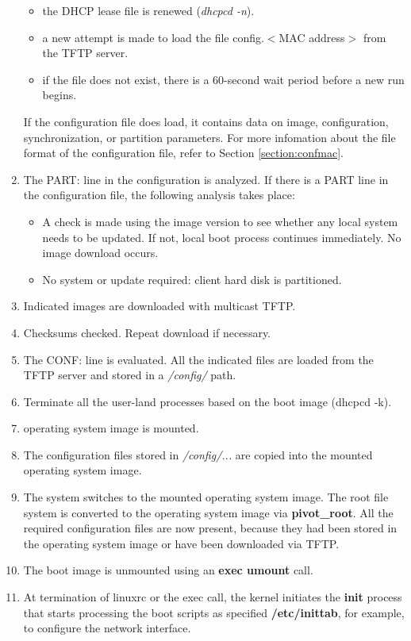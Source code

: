 \begin{enumerate}
          \begin{itemize}
          \item the DHCP lease file is renewed (\textit{dhcpcd -n}).
          \item a new attempt is made to load the file
                config.$<$MAC address$>$ from the TFTP server.
          \item if the file does not exist, there is a 60-second wait
                period before a new run begins.
          \end{itemize}

          If the configuration file does load, it contains data on
          image, configuration, synchronization, or partition parameters.
          For more infomation about the file format of the configuration file,
          refer to Section \ref{section:confmac}.

	\item The PART: line in the configuration is analyzed. If there is a
          PART line in the configuration file, the following analysis
          takes place:
          \begin{itemize}
          \item A check is made using the image version to see whether any
                local system needs to be updated. If not, local boot process
                continues immediately. No image download occurs.
          \item No system or update required: client hard disk is
                partitioned.
          \end{itemize}
	\item Indicated images are downloaded with multicast TFTP.
	\item Checksums checked. Repeat download if necessary.
	\item The CONF: line is evaluated. All the indicated files are loaded
          from the TFTP server and stored in a \textit{/config/} path.
	\item Terminate all the user-land processes based on the boot image
          (dhcpcd -k).
	\item operating system image is mounted.
	\item The configuration files stored in \textit{/config/...} are copied
          into the mounted operating system image.
	\item The system switches to the mounted operating system image. The root
          file system is converted to the operating system image via
          \textbf{pivot\_root}. All the required configuration files are
          now present, because they had been stored in the operating system
          image or have been downloaded via TFTP.
	\item The boot image is unmounted using an \textbf{exec umount} call.
	\item At termination of linuxrc or the exec call, the kernel initiates
          the \textbf{init} process that starts processing the boot
          scripts as specified \textbf{/etc/inittab}, for example,
          to configure the network interface.
\end{enumerate}

